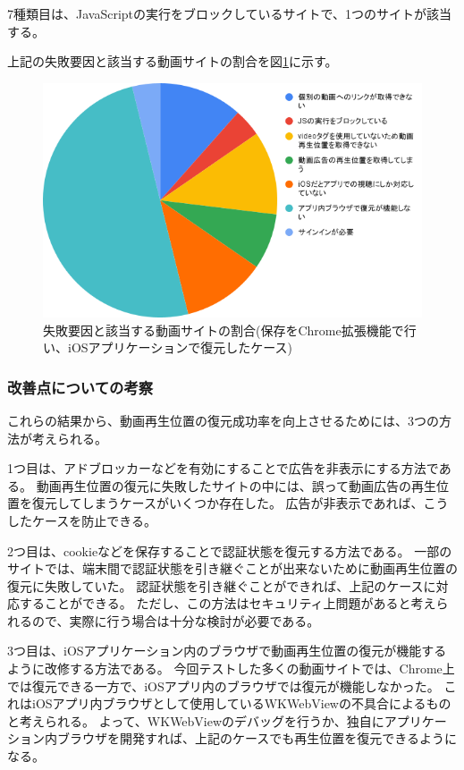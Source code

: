 7種類目は、JavaScriptの実行をブロックしているサイトで、1つのサイトが該当する。

上記の失敗要因と該当する動画サイトの割合を図\ref{fig:evl-consideration-video-cause-ratio-chrome-ios}に示す。

\begin{figure}[htbp]
  \caption{失敗要因と該当する動画サイトの割合(保存をChrome拡張機能で行い、iOSアプリケーションで復元したケース)}
  \label{fig:evl-consideration-video-cause-ratio-chrome-ios}
  \begin{center}
    \includegraphics[bb=0 0 600 371,width=15cm]{img/060_evaluation/consideration/video/cause-ratio-chrome-ios.pdf}
  \end{center}
\end{figure}

\subsubsection{改善点についての考察}
これらの結果から、動画再生位置の復元成功率を向上させるためには、3つの方法が考えられる。

1つ目は、アドブロッカーなどを有効にすることで広告を非表示にする方法である。
動画再生位置の復元に失敗したサイトの中には、誤って動画広告の再生位置を復元してしまうケースがいくつか存在した。
広告が非表示であれば、こうしたケースを防止できる。

2つ目は、cookieなどを保存することで認証状態を復元する方法である。
一部のサイトでは、端末間で認証状態を引き継ぐことが出来ないために動画再生位置の復元に失敗していた。
認証状態を引き継ぐことができれば、上記のケースに対応することができる。
ただし、この方法はセキュリティ上問題があると考えられるので、実際に行う場合は十分な検討が必要である。

3つ目は、iOSアプリケーション内のブラウザで動画再生位置の復元が機能するように改修する方法である。
今回テストした多くの動画サイトでは、Chrome上では復元できる一方で、iOSアプリ内のブラウザでは復元が機能しなかった。
これはiOSアプリ内ブラウザとして使用しているWKWebViewの不具合によるものと考えられる。
よって、WKWebViewのデバッグを行うか、独自にアプリケーション内ブラウザを開発すれば、上記のケースでも再生位置を復元できるようになる。
